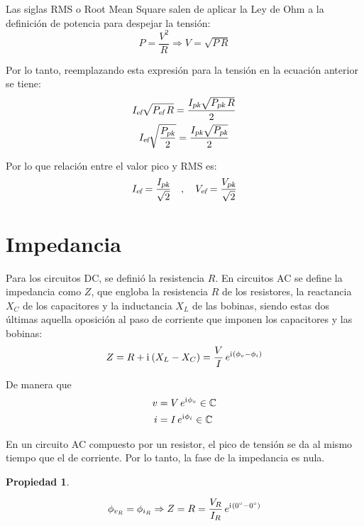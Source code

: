 \documentclass[a5paper,12pt,twoside]{book}
\newtheorem{prop}{{Propiedad}}[chapter]
\begin{document}
Las siglas RMS o Root Mean Square salen de aplicar la Ley de Ohm a la definición de potencia para despejar la tensión:
\begin{equation*}
    P = \frac{V^2}{R} \Rightarrow V = \sqrt{P \, R}
\end{equation*}

Por lo tanto, reemplazando esta expresión para la tensión en la ecuación anterior se tiene:
\begin{gather*}
    {{{I}_\textsl{{ef}}}} \sqrt{{{{P}_\textsl{{ef}}}} \, R} = \frac{{{{I}_\textsl{{pk}}}} \sqrt{{{{P}_\textsl{{pk}}}} \, R}}{2}
    \\
    {{{I}_\textsl{{ef}}}} \sqrt{\frac{{{{P}_\textsl{{pk}}}}}{2}} = \frac{{{{I}_\textsl{{pk}}}} \sqrt{{{{P}_\textsl{{pk}}}}}}{2}
\end{gather*}

Por lo que relación entre el valor pico y RMS es:
\begin{equation*}
    {{{I}_\textsl{{ef}}}} = \frac{{{{I}_\textsl{{pk}}}}}{\sqrt{2}}
    \quad , \quad
    {{{V}_\textsl{{ef}}}} = \frac{{{{V}_\textsl{{pk}}}}}{\sqrt{2}}
\end{equation*}


\section{Impedancia}

Para los circuitos DC, se definió la resistencia $R$. En circuitos AC se define la impedancia como $Z$, que engloba la resistencia $R$ de los resistores, la reactancia $X_C$ de los capacitores y la inductancia $X_L$ de las bobinas, siendo estas dos últimas aquella oposición al paso de corriente que imponen los capacitores y las bobinas:
\begin{equation}
    Z = R + \mathrm{i}\mkern1mu \left(X_L - X_C\right) = \frac{V}{I} \, e^{\mathrm{i}\mkern1mu \left(\phi_v - \phi_i\right)}
\end{equation}

De manera que
\begin{align*}
    v &= V \, e^{\mathrm{i}\mkern1mu \phi_v} \in \mathbb{C}
    \\
    i &= I \, e^{\mathrm{i}\mkern1mu \phi_i} \in \mathbb{C}
\end{align*}

En un circuito AC compuesto por un resistor, el pico de tensión se da al mismo tiempo que el de corriente. Por lo tanto, la fase de la impedancia es nula.

\begin{mdframed}[style=MyFrame1]
    \begin{prop}
    \end{prop}
    \begin{equation*}
        \phi_{v_R} = \phi_{i_R} \Rightarrow Z = R = \frac{V_R}{I_R} \, e^{\mathrm{i}\mkern1mu \left(\ang{0} - \ang{0}\right)}
    \end{equation*}
\end{mdframed}
\end{document}
